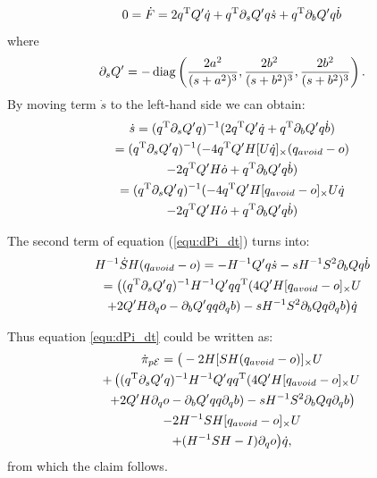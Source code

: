 \documentclass[10pt,twocolumn,twoside]{IEEEtran}
\begin{document}
    \begin{equation}
      0=\dot F =  2q^\mathrm{T} Q' \dot q + q^\mathrm{T} \partial_s Q' q \dot s + q^\mathrm{T} \partial_bQ' q \dot b
    \end{equation}
    where
    \begin{equation}
      \partial_s Q'= -\operatorname{diag}\left(\frac{2a^2}{(s+a^2)^3},\frac{2b^2}{(s+b^2)^3},\frac{2b^2}{(s+b^2)^3}\right).
    \end{equation}
    By moving term $\dot s$ to the left-hand side we can obtain:
    \begin{multline}\label{equ:s_dot}
      \dot s =  (q^\mathrm{T} \partial_s Q' q)^{-1} (2q^\mathrm{T} Q' \dot q + q^\mathrm{T} \partial_b Q' q \dot b)\\
      =  (q^\mathrm{T} \partial_s Q' q)^{-1} (-4q^\mathrm{T} Q' H[U\dot q]_\times (q_{avoid} - o) \\
      -2q^\mathrm{T} Q'H\dot o + q^\mathrm{T} \partial_b Q' q \dot b)\\
      =  (q^\mathrm{T} \partial_s Q' q)^{-1} (-4q^\mathrm{T} Q' H[q_{avoid} - o]_\times U\dot q \\
      -2q^\mathrm{T} Q'H\dot o + q^\mathrm{T} \partial_b Q' q \dot b)
    \end{multline}

    The second term of equation (\ref{equ:dPi_dt}) turns into:
    \begin{multline}
      H^{-1}\dot S H (q_{avoid} - o)
      = - H^{-1} Q' q \dot s - s H^{-1} S^2 \partial_b Q q \dot b\\
      =   \big( (q^\mathrm{T} \partial_s Q' q)^{-1} H^{-1} Q' q q^\mathrm{T}  (4Q' H[q_{avoid} - o]_\times U  \\
      + 2Q' H\partial_q o - \partial_b Q' q q \partial_q b) -  s H^{-1} S^2 \partial_b Q q \partial_q b\big) \dot q\\
    \end{multline}

    Thus equation \eqref{equ:dPi_dt} could be written as:
    \begin{multline}
      \dot \pi_{p\mathcal{E}} = \big(-2 H [ SH(q_{avoid}-o)]_{\times}U   \\
      + \left( (q^\mathrm{T} \partial_s Q' q)^{-1} H^{-1} Q' q q^\mathrm{T}  (4Q' H[q_{avoid} - o]_\times U \right. \\
      \left.+ 2Q' H\partial_q o - \partial_b Q' q q \partial_q b) -  s H^{-1} S^2 \partial_b Q q \partial_q b\right) \\
      -2H^{-1} S H[q_{avoid}-o]_{\times} U  \\
      + (H^{-1}SH -I)\partial_q o \big) \dot q,
    \end{multline}
    from which the claim follows.
  
\end{document}
